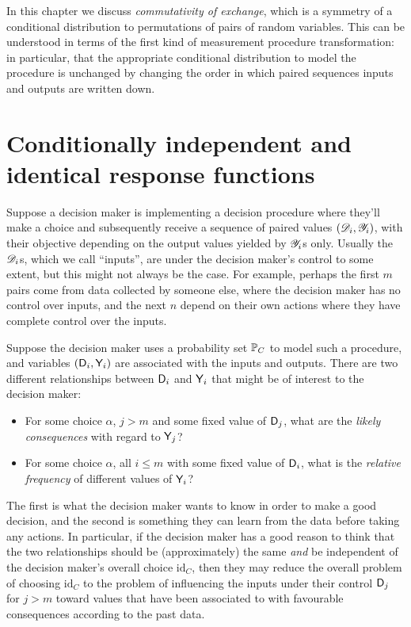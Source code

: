 In this chapter we discuss \emph{commutativity of exchange}, which is a symmetry of a conditional distribution to permutations of pairs of random variables. This can be understood in terms of the first kind of measurement procedure transformation: in particular, that the appropriate conditional distribution to model the procedure is unchanged by changing the order in which paired sequences inputs and outputs are written down.

\section[Response functions]{Conditionally independent and identical response functions}\label{sec:response_functions}

Suppose a decision maker is implementing a decision procedure where they'll make a choice and subsequently receive a sequence of paired values $(\mathscr{D}_i,\mathscr{Y}_i)$, with their objective depending on the output values yielded by $\mathscr{Y}_i$s only. Usually the $\mathscr{D}_i$s, which we call ``inputs'', are under the decision maker's control to some extent, but this might not always be the case. For example, perhaps the first $m$ pairs come from data collected by someone else, where the decision maker has no control over inputs, and the next $n$ depend on their own actions where they have complete control over the inputs.

Suppose the decision maker uses a probability set $\mathbb{P}_C$ to model such a procedure, and variables $(\mathsf{D}_i,\mathsf{Y}_i)$ are associated with the inputs and outputs. There are two different relationships between $\mathsf{D}_i$ and $\mathsf{Y}_i$ that might be of interest to the decision maker:
\begin{itemize}
    \item For some choice $\alpha$, $j>m$ and some fixed value of $\mathsf{D}_j$, what are the \emph{likely consequences} with regard to $\mathsf{Y}_j$?
    \item For some choice $\alpha$, all $i\leq m$ with some fixed value of $\mathsf{D}_i$, what is the \emph{relative frequency} of different values of $\mathsf{Y}_i$?
\end{itemize}
The first is what the decision maker wants to know in order to make a good decision, and the second is something they can learn from the data before taking any actions. In particular, if the decision maker has a good reason to think that the two relationships should be (approximately) the same \emph{and} be independent of the decision maker's overall choice $\text{id}_C$, then they may reduce the overall problem of choosing $\text{id}_C$ to the problem of influencing the inputs under their control $\mathsf{D}_j$ for $j>m$ toward values that have been associated to with favourable consequences according to the past data.

